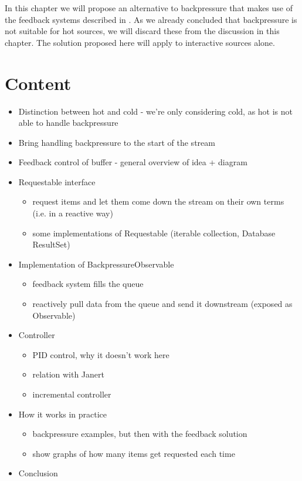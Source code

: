 In this chapter we will propose an alternative to backpressure that makes use of the feedback systems described in . As we already concluded that backpressure is not suitable for hot sources, we will discard these from the discussion in this chapter. The solution proposed here will apply to interactive sources alone.

\clearpage
\section*{Content}
\begin{itemize}
	\item[\checkmark] Distinction between hot and cold - we're only considering cold, as hot is not able to handle backpressure
	\item Bring handling backpressure to the start of the stream
	\item Feedback control of buffer - general overview of idea + diagram
	\item Requestable interface
		\begin{itemize}
			\item request items and let them come down the stream on their own terms (i.e. in a reactive way)
			\item some implementations of Requestable (iterable collection, Database ResultSet)
		\end{itemize}
	\item Implementation of BackpressureObservable
		\begin{itemize}
			\item feedback system fills the queue
			\item reactively pull data from the queue and send it downstream (exposed as Observable)
		\end{itemize}
	\item Controller
		\begin{itemize}
			\item PID control, why it doesn't work here
			\item relation with Janert
			\item incremental controller
		\end{itemize}
	\item How it works in practice
		\begin{itemize}
			\item backpressure examples, but then with the feedback solution
			\item show graphs of how many items get requested each time
		\end{itemize}
	\item Conclusion
\end{itemize}